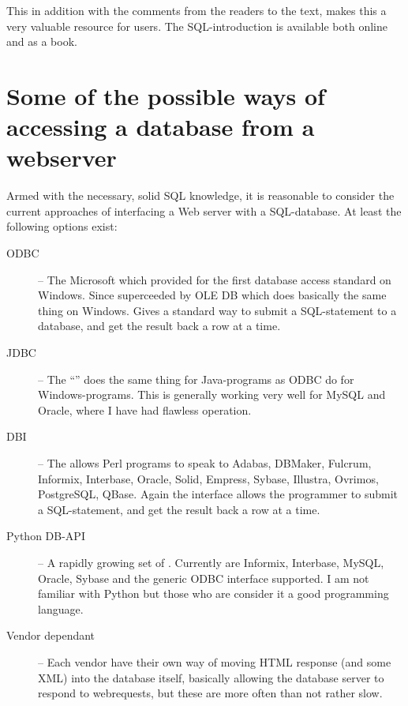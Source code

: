 
This in addition with the comments from the readers to the text, makes
this a very valuable resource for users.  The SQL-introduction is
available both online and as a book.


\section{Some of the possible ways of accessing a database from a webserver}
\label{sec:accessing-a-database-from-a-webserver}

Armed with the necessary, solid SQL knowledge, it is reasonable to
consider the current approaches of interfacing a Web server with a
SQL-database.  At least the following options exist:

\begin{description}
\item[ODBC] -- The Microsoft  which
  provided for the first database access standard on Windows.  Since
  superceeded by OLE DB which does basically the same thing on
  Windows.  Gives a standard way to submit a SQL-statement to a
  database, and get the result back a row at a time.
\item[JDBC] -- The ``'' does the same thing for Java-programs as ODBC do for
  Windows-programs.  This is generally working very well for MySQL and
  Oracle, where I have had flawless operation.
  
\item[DBI] -- The 
  allows Perl programs to speak to Adabas, DBMaker, Fulcrum, Informix,
  Interbase, Oracle, Solid, Empress, Sybase, Illustra, Ovrimos,
  PostgreSQL, QBase.  Again the interface allows the programmer to
  submit a SQL-statement, and get the result back a row at a time.
\item[Python DB-API] -- A rapidly growing set of
  .  Currently are Informix, Interbase,
  MySQL, Oracle, Sybase and the generic ODBC interface supported.  I
  am not familiar with Python but those who are consider it a good
  programming language.
  
\item[Vendor dependant] -- Each vendor have their own way of moving
HTML response (and some XML) into the database itself, basically
allowing the database server to respond to webrequests, but these are
more often than not rather slow.
\end{description}


